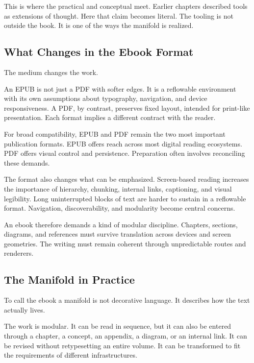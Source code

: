 \documentclass[
]{article}
\begin{document}
This is where the practical and conceptual meet. Earlier chapters
described tools as extensions of thought. Here that claim becomes
literal. The tooling is not outside the book. It is one of the ways the
manifold is realized.

\hypertarget{what-changes-in-the-ebook-format}{%
\subsection{What Changes in the Ebook
Format}\label{what-changes-in-the-ebook-format}}

The medium changes the work.

An EPUB is not just a PDF with softer edges. It is a reflowable
environment with its own assumptions about typography, navigation, and
device responsiveness. A PDF, by contrast, preserves fixed layout,
intended for print-like presentation. Each format implies a different
contract with the reader.

For broad compatibility, EPUB and PDF remain the two most important
publication formats. EPUB offers reach across most digital reading
ecosystems. PDF offers visual control and persistence. Preparation often
involves reconciling these demands.

The format also changes what can be emphasized. Screen-based reading
increases the importance of hierarchy, chunking, internal links,
captioning, and visual legibility. Long uninterrupted blocks of text are
harder to sustain in a reflowable format. Navigation, discoverability,
and modularity become central concerns.

An ebook therefore demands a kind of modular discipline. Chapters,
sections, diagrams, and references must survive translation across
devices and screen geometries. The writing must remain coherent through
unpredictable routes and renderers.

\hypertarget{the-manifold-in-practice}{%
\subsection{The Manifold in Practice}\label{the-manifold-in-practice}}

To call the ebook a manifold is not decorative language. It describes
how the text actually lives.

The work is modular. It can be read in sequence, but it can also be
entered through a chapter, a concept, an appendix, a diagram, or an
internal link. It can be revised without retypesetting an entire volume.
It can be transformed to fit the requirements of different
infrastructures.
\end{document}
